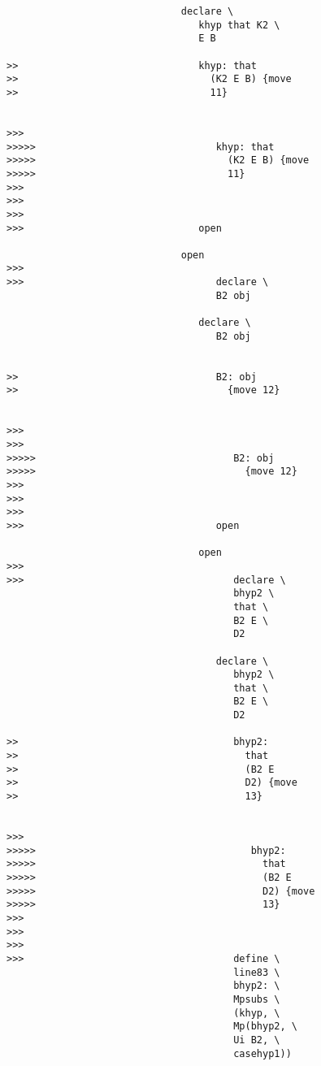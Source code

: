 \documentclass[12pt]{article}
\begin{document}
\begin{verbatim}
                              declare \
                                 khyp that K2 \
                                 E B

>>                               khyp: that
>>                                 (K2 E B) {move
>>                                 11}


>>>
>>>>>                               khyp: that
>>>>>                                 (K2 E B) {move
>>>>>                                 11}
>>>
>>>
>>>
>>>                              open

                              open
>>>
>>>                                 declare \
                                    B2 obj

                                 declare \
                                    B2 obj


>>                                  B2: obj
>>                                    {move 12}


>>>
>>>
>>>>>                                  B2: obj
>>>>>                                    {move 12}
>>>
>>>
>>>
>>>                                 open

                                 open
>>>
>>>                                    declare \
                                       bhyp2 \
                                       that \
                                       B2 E \
                                       D2

                                    declare \
                                       bhyp2 \
                                       that \
                                       B2 E \
                                       D2

>>                                     bhyp2:
>>                                       that
>>                                       (B2 E
>>                                       D2) {move
>>                                       13}


>>>
>>>>>                                     bhyp2:
>>>>>                                       that
>>>>>                                       (B2 E
>>>>>                                       D2) {move
>>>>>                                       13}
>>>
>>>
>>>
>>>                                    define \
                                       line83 \
                                       bhyp2: \
                                       Mpsubs \
                                       (khyp, \
                                       Mp(bhyp2, \
                                       Ui B2, \
                                       casehyp1))


\end{verbatim}
\end{document}
